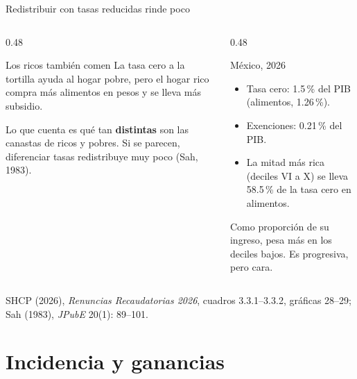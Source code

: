 \documentclass[aspectratio=169,11pt]{beamer}
\newcommand{\fuente}[1]{\par\vfill{\small\color{cGris}#1\par}}
\begin{document}
\begin{frame}{Redistribuir con tasas reducidas rinde poco}
  \begin{columns}[T]
    \begin{column}{0.48\textwidth}
      \begin{block}{Los ricos también comen}
        La tasa cero a la tortilla ayuda al hogar pobre, pero el hogar rico compra más alimentos en pesos y se lleva más subsidio.
      \end{block}
      \pause
      Lo que cuenta es qué tan \textbf{distintas} son las canastas de ricos y pobres. Si se parecen, diferenciar tasas redistribuye muy poco (Sah, 1983).
    \end{column}
    \begin{column}{0.48\textwidth}
      \pause
      \begin{block}{México, 2026}
        \begin{itemize}
          \item Tasa cero: 1.5\,\% del PIB (alimentos, 1.26\,\%).
          \item Exenciones: 0.21\,\% del PIB.
          \item La mitad más rica (deciles VI a X) se lleva 58.5\,\% de la tasa cero en alimentos.
        \end{itemize}
      \end{block}
      \pause
      Como proporción de su ingreso, pesa más en los deciles bajos. Es progresiva, pero cara.
    \end{column}
  \end{columns}
  \fuente{SHCP (2026), \emph{Renuncias Recaudatorias 2026}, cuadros 3.3.1--3.3.2, gráficas 28--29; Sah (1983), \emph{JPubE} 20(1): 89--101.}
\end{frame}

\section{Incidencia y ganancias}
\end{document}
